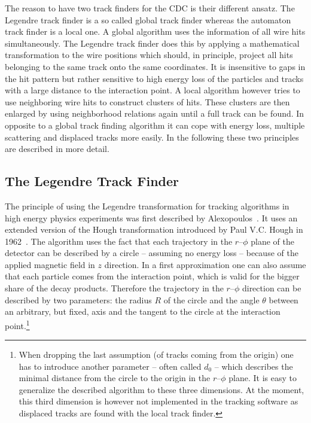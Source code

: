 The reason to have two track finders for the CDC is their different ansatz. The Legendre track finder is a so called global track finder whereas the automaton track finder is a local one. A global algorithm uses the information of all wire hits simultaneously. The Legendre track finder does this by applying a mathematical transformation to the wire positions which should, in principle, project all hits belonging to the same track onto the same coordinates. It is insensitive to gaps in the hit pattern but rather sensitive to high energy loss of the particles and tracks with a large distance to the interaction point. A local algorithm however tries to use neighboring wire hits to construct clusters of hits. These clusters are then enlarged by using neighborhood relations again until a full track can be found. In opposite to a global track finding algorithm it can cope with energy loss, multiple scattering and displaced tracks more easily. In the following these two principles are described in more detail.


\subsection{The Legendre Track Finder}
The principle of using the Legendre transformation for tracking algorithms in high energy physics experiments was first described by Alexopoulos~\cite{legendre}. It uses an extended version of the Hough transformation introduced by Paul V.C. Hough in 1962~\cite{hough}. The algorithm uses the fact that each trajectory in the $r$--$\phi$ plane of the detector can be described by a circle -- assuming no energy loss -- because of the applied magnetic field in $z$ direction. In a first approximation one can also assume that each particle comes from the interaction point, which is valid for the bigger share of the decay products. Therefore the trajectory in the $r$--$\phi$ direction can be described by two parameters: the radius $R$ of the circle and the angle $\theta$ between an arbitrary, but fixed, axis and the tangent to the circle at the interaction point.\footnote{When dropping the last assumption (of tracks coming from the origin) one has to introduce another parameter -- often called $d_0$ -- which describes the minimal distance from the circle to the origin in the $r$--$\phi$ plane. It is easy to generalize the described algorithm to these three dimensions. At the moment, this third dimension is however not implemented in the tracking software as displaced tracks are found with the local track finder.}


